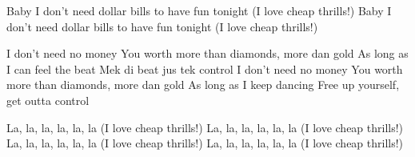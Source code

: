 Baby I don't need dollar bills to have fun tonight
(I love cheap thrills!)
Baby I don't need dollar bills to have fun tonight
(I love cheap thrills!)

I don't need no money
You worth more than diamonds, more dan gold
As long as I can feel the beat
Mek di beat jus tek control
I don't need no money
You worth more than diamonds, more dan gold
As long as I keep dancing
Free up yourself, get outta control

La, la, la, la, la, la
(I love cheap thrills!)
La, la, la, la, la, la
(I love cheap thrills!)
La, la, la, la, la, la
(I love cheap thrills!)
La, la, la, la, la, la
(I love cheap thrills!)
